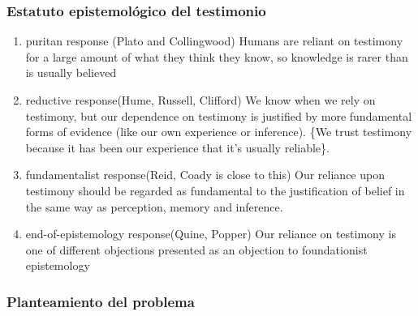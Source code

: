 \documentclass[11pt]{article}
\begin{document}
\subsubsection{Estatuto epistemológico del testimonio}
\label{sec-4-1-1}

\begin{enumerate}
\item puritan response (Plato and Collingwood)
\label{sec-4-1-1-1}
Humans are reliant on testimony for a large amount of what they think they know, so knowledge is rarer than is usually believed

\item reductive response(Hume, Russell, Clifford)
\label{sec-4-1-1-2}
We know when we rely on testimony, but our dependence on testimony is justified by more fundamental forms of evidence (like our own experience or inference). \{We trust testimony because it has been our experience that it's usually reliable\}.

\item fundamentalist response(Reid, Coady is close to this)
\label{sec-4-1-1-3}
Our reliance upon testimony should be regarded as fundamental to the justification of belief in the same way as perception, memory and inference.

\item end-of-epistemology response(Quine, Popper)
\label{sec-4-1-1-4}
Our reliance on testimony is one of different objections presented as an objection to foundationist epistemology
\end{enumerate}

\subsubsection{Planteamiento del problema}
\label{sec-4-1-2}
\end{document}
